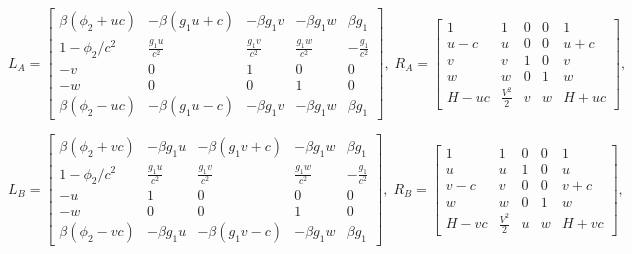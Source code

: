 \documentclass{article}
\begin{document}
\begin{equation}
  L_A=\left[
    \begin{array}{ccccc}
      \beta(\phi_2 + u c) & -\beta (g_1 u + c) & -\beta g_1 v & -\beta g_1 w & \beta g_1 \\
      1 - \phi_2/c^2     & \frac{g_1 u}{c^2}   & \frac{g_1 v}{c^2} & \frac{g_1 w}{c^2} & -\frac{g_1}{c^2}\\
      -v & 0 & 1 & 0 & 0\\
      -w & 0 & 0 & 1 & 0\\
      \beta(\phi_2 - u c) & -\beta (g_1 u - c) & -\beta g_1 v & -\beta g_1 w & \beta g_1
    \end{array}
  \right],\;
  R_A=\left[
    \begin{array}{ccccc}
      1    & 1             & 0 & 0 & 1\\
      u-c  & u             & 0 & 0 & u+c\\
      v    & v             & 1 & 0 & v\\
      w    & w             & 0 & 1 & w\\
      H-uc & \frac{V^2}{2} & v & w & H+uc
    \end{array}
  \right],
\end{equation}

\begin{equation}
  L_B=\left[
    \begin{array}{ccccc}
      \beta(\phi_2 + v c) & -\beta g_1 u & -\beta (g_1 v + c) & -\beta g_1 w & \beta g_1 \\
      1 - \phi_2/c^2     & \frac{g_1 u}{c^2}   & \frac{g_1 v}{c^2} & \frac{g_1 w}{c^2} & -\frac{g_1}{c^2}\\
      -u & 1 & 0 & 0 & 0\\
      -w & 0 & 0 & 1 & 0\\
      \beta(\phi_2 - v c) & -\beta g_1 u & -\beta (g_1 v - c) & -\beta g_1 w & \beta g_1
    \end{array}
  \right],\;
  R_B=\left[
    \begin{array}{ccccc}
      1    & 1             & 0 & 0 & 1\\
      u    & u             & 1 & 0 & u\\
      v-c  & v             & 0 & 0 & v+c\\
      w    & w             & 0 & 1 & w\\
      H-vc & \frac{V^2}{2} & u & w & H+vc
    \end{array}
  \right],
\end{equation}
\end{document}

